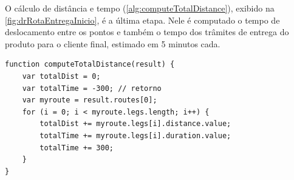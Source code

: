 O cálculo de distância e tempo (\autoref{alg:computeTotalDistance}), exibido na \autoref{fig:drRotaEntregaInicio}, é a última etapa. Nele é computado o tempo de deslocamento entre os pontos e também o tempo dos trâmites de entrega do produto para o cliente final, estimado em 5 minutos cada.

\begin{lstlisting}[caption={Delivery Routes - Waypoints}, style=htmlcssjs, label=alg:computeTotalDistance]
function computeTotalDistance(result) {
    var totalDist = 0;
    var totalTime = -300; // retorno
    var myroute = result.routes[0];
    for (i = 0; i < myroute.legs.length; i++) {
        totalDist += myroute.legs[i].distance.value;
        totalTime += myroute.legs[i].duration.value;
        totalTime += 300;
    }
}
\end{lstlisting}